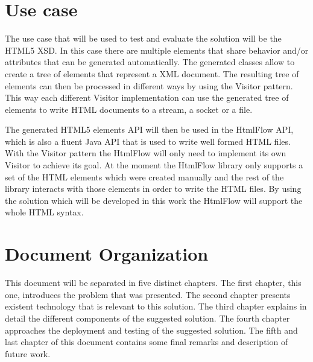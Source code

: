 \section{Use case}
\label{sec:usecase}

The use case that will be used to test and evaluate the solution will be the \ac{HTML}5 \ac{XSD}. In this case there are multiple elements that share behavior and/or attributes that can be generated automatically. The generated classes allow to create a tree of elements that represent a \ac{XML} document. The resulting tree of elements can then be processed in different ways by using the Visitor pattern. This way each different Visitor implementation can use the generated tree of elements to write \ac{HTML} documents to a stream, a socket or a file. 

\noindent
The generated \ac{HTML}5 elements \ac{API} will then be used in the HtmlFlow \ac{API}, which is also a fluent Java \ac{API} that is used to write well formed \ac{HTML} files. With the Visitor pattern the HtmlFlow will only need to implement its own Visitor to achieve its goal. At the moment the HtmlFlow library only supports a set of the \ac{HTML} elements which were created manually and the rest of the library interacts with those elements in order to write the \ac{HTML} files. By using the solution which will be developed in this work the HtmlFlow will support the whole \ac{HTML} syntax. 

\section{Document Organization}

This document will be separated in five distinct chapters. The first chapter, this one, introduces the problem that was presented. The second chapter presents existent technology that is relevant to this solution. The third chapter explains in detail the different components of the suggested solution. The fourth chapter approaches the deployment and testing of the suggested solution. The fifth and last chapter of this document contains some final remarks and description of future work.